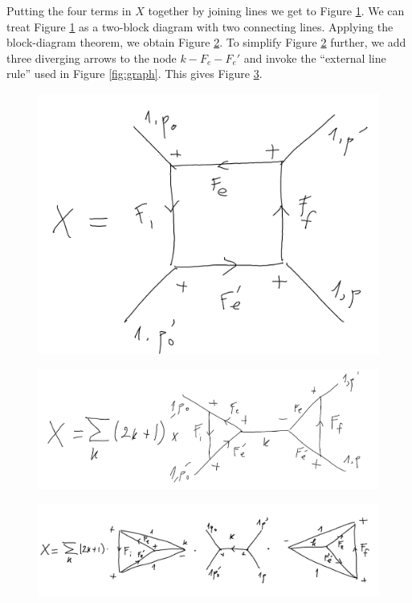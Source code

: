 \documentclass[11pt]{article}
\begin{document}
Putting the four terms in $X$ together by joining lines we get to Figure \ref{fig:X2}. We can treat Figure \ref{fig:X2} as a two-block diagram with two connecting lines. Applying the block-diagram theorem, we obtain Figure \ref{fig:X3}. To simplify Figure \ref{fig:X3} further, we add three diverging arrows to the node $k-F_e-F_e'$ and invoke the ``external line rule'' used in Figure \ref{fig:graph}. This gives Figure \ref{fig:X4}.
\begin{figure}[!htb]
	\centering
	\includegraphics[scale=0.3]{draw_ang_2}
	\caption{}
	\label{fig:X2}
\end{figure}
\begin{figure}[!htb]
	\centering
	\includegraphics[scale=0.4]{draw_ang_3}
	\caption{}
	\label{fig:X3}
\end{figure}
\begin{figure}[!htb]
	\centering
	\includegraphics[scale=0.6]{draw_ang_4}
	\caption{}
	\label{fig:X4}
\end{figure}  
\end{document}
